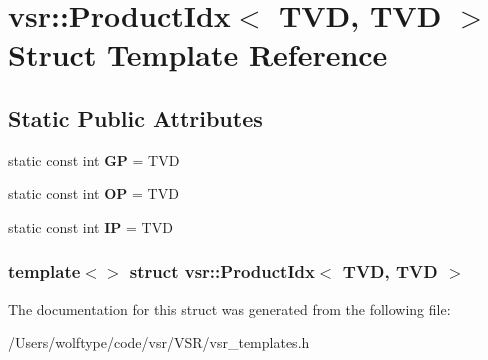 \hypertarget{structvsr_1_1_product_idx_3_01_t_v_d_00_01_t_v_d_01_4}{\section{vsr\-:\-:Product\-Idx$<$ T\-V\-D, T\-V\-D $>$ Struct Template Reference}
\label{structvsr_1_1_product_idx_3_01_t_v_d_00_01_t_v_d_01_4}
}
\subsection*{Static Public Attributes}
\begin{DoxyCompactItemize}
\item 
\hypertarget{structvsr_1_1_product_idx_3_01_t_v_d_00_01_t_v_d_01_4_a84697674fedf6ca348a02ded0de5ca4e}{static const int {\bfseries G\-P} = T\-V\-D}\label{structvsr_1_1_product_idx_3_01_t_v_d_00_01_t_v_d_01_4_a84697674fedf6ca348a02ded0de5ca4e}

\item 
\hypertarget{structvsr_1_1_product_idx_3_01_t_v_d_00_01_t_v_d_01_4_a95b25fcd622c493da2c084ea446b4e30}{static const int {\bfseries O\-P} = T\-V\-D}\label{structvsr_1_1_product_idx_3_01_t_v_d_00_01_t_v_d_01_4_a95b25fcd622c493da2c084ea446b4e30}

\item 
\hypertarget{structvsr_1_1_product_idx_3_01_t_v_d_00_01_t_v_d_01_4_ac017056ba15a217b1a5644f03bbebd1e}{static const int {\bfseries I\-P} = T\-V\-D}\label{structvsr_1_1_product_idx_3_01_t_v_d_00_01_t_v_d_01_4_ac017056ba15a217b1a5644f03bbebd1e}

\end{DoxyCompactItemize}
\subsubsection*{template$<$$>$ struct vsr\-::\-Product\-Idx$<$ T\-V\-D, T\-V\-D $>$}



The documentation for this struct was generated from the following file\-:\begin{DoxyCompactItemize}
\item 
/\-Users/wolftype/code/vsr/\-V\-S\-R/vsr\-\_\-templates.\-h\end{DoxyCompactItemize}
